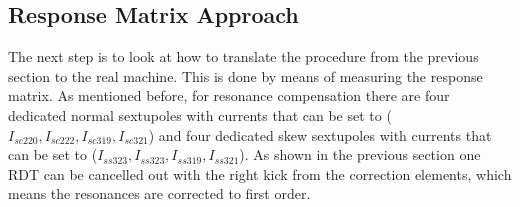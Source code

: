 \subsection{Response Matrix Approach}

The next step is to look at how to translate the procedure from the previous section to the real machine. This is done by means of measuring the response matrix. As mentioned before, for resonance compensation there are four dedicated normal sextupoles with currents that can be set to ($I_{sc220},I_{sc222},I_{sc319},I_{sc321}$) and four dedicated skew sextupoles with currents that can be set to ($I_{ss323},I_{ss323},I_{ss319},I_{ss321}$). As shown in the previous section one RDT can be cancelled out with the right kick from the correction elements, which means the resonances are corrected to first order. 

